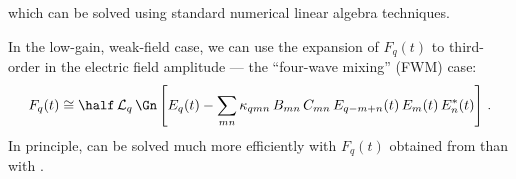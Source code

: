 which can be solved using standard numerical linear algebra techniques.%

In the low-gain, weak-field case, we can use the expansion of $F_q(t)$ to third-order in the electric field amplitude --- the ``four-wave mixing'' (FWM) case:
 \begin{equation} \label{eqn:mll_swl_fqt_fwm}
F_q(t) \cong \half\, \mathcal{L}_q\, \Gn \left[ E_q(t) - \sum_{m n} \kappa_{q m n}\, B_{m n}\, C_{m n}\, E_{q - m + n}(t)\, E_m(t)\, E_n^\ast(t) \right]\, .
 \end{equation}
In principle,  can be solved much more efficiently with $F_q(t)$ obtained from  than with .
%
%
%

